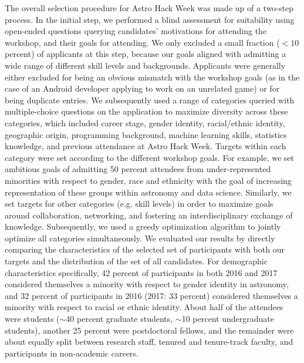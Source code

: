 \documentclass{aastex62}
\begin{document}
The overall selection procedure for Astro Hack Week was made up of a two-step process. In the initial step, we performed a blind assessment for suitability using open-ended questions querying candidates' motivations for attending the workshop, and their goals for attending. We only excluded a small fraction ($<10$ percent) of applicants at this step, because our goals aligned with admitting a wide range of different skill levels and backgrounds. Applicants were generally either excluded for being an obvious mismatch with the workshop goals (as in the case of an Android developer applying to work on an unrelated game) or for being duplicate entries. We subsequently used a range of categories queried with multiple-choice questions  on the application to maximize diversity across these categories, which included career stage, gender identity, racial/ethnic identity, geographic origin, programming background, machine learning skills, statistics knowledge, and previous attendance at Astro Hack Week. Targets within each category were set according to the different workshop goals. For example, we set ambitious goals of admitting 50 percent attendees from under-represented minorities with respect to gender, race and ethnicity with the goal of increasing representation of these groups within astronomy and data science. Similarly, we set targets for other categories (e.g. skill levels) in order to maximize goals around collaboration, networking, and fostering an interdisciplinary exchange of knowledge. Subsequently, we used a greedy optimization algorithm to jointly optimize all categories simultaneously. We evaluated our results by directly comparing the characteristics of the selected set of participants with both our targets and the distribution of the set of all candidates. For demographic characteristics specifically, 42 percent of participants in both 2016 and 2017 considered themselves a minority with respect to gender identity in astronomy, and 32 percent of participants in 2016 (2017: 33 percent) considered themselves a minority with respect to racial or ethnic identity. About half of the attendees were students ($\sim$40 percent graduate students, $\sim$10 percent undergraduate students), another 25 percent were postdoctoral fellows, and the remainder were about equally split between research staff, tenured and tenure-track faculty, and participants in non-academic careers.
\end{document}
